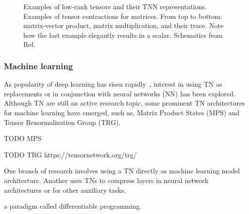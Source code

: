 \begin{figure}[htb]
    \centering
     \qquad
    
    \caption{\protect{} Examples of low-rank tensors and their TNN representations. \protect{} Examples of tensor contractions for matrices. From top to bottom: matrix-vector product, matrix multiplication, and their trace. Note how the last example elegantly results in a scalar. Schematics from Ref.~\cite{Stoudenmire2021}}
    \label{fig:tensor_diagrams}
\end{figure}


\subsubsection{Machine learning}

As popularity of deep learning has risen rapidly~\cite{DL_review}, interest in using TN as replacements or in conjunction with neural networks (NN) has been explored.
Although TN are still an active research topic, some prominent TN architectures for machine learning have emerged, such as, Matrix Product States (MPS) and Tensor Renormalization Group (TRG).

TODO MPS


TODO TRG https://tensornetwork.org/trg/


One branch of research involves using a TN directly as machine learning model architecture. Another uses TNs to compress layers in neural network architectures or for other auxiliary tasks.

a paradigm called differentiable programming.



